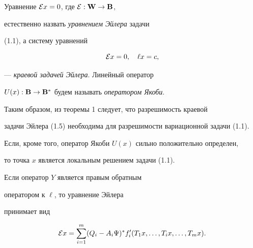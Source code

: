 




Уравнение ${\cal E}x=0$, где ${\cal E}:\to{}$,


естественно назвать {\it уравнением Эйлера} задачи


(1.1), а систему уравнений


\begin{equation}


{\cal E}x=0,\quad \ell x=c,


\end{equation}


--- {\it краевой задачей Эйлера}. Линейный оператор


$U(x):\to{}^*$ будем называть {\it оператором Якоби}.


Таким образом, из теоремы 1 следует, что разрешимость краевой


задачи Эйлера (1.5) необходима для разрешимости вариационной задачи (1.1).


Если, кроме того, оператор Якоби $U(x)$ сильно положительно определен,


то точка $x$ является локальным решением задачи (1.1).





\begin{cornonum} Если оператор $Y$ является правым обратным


оператором к $\ell$, то уравнение Эйлера


принимает вид


$$


{\cal E}x=\sum_{i=1}^m(Q_i-A_i\Psi)^*f'_i(T_1x,\dotsc,T_ix,\dotsc,T_mx).


$$


\end{cornonum}





